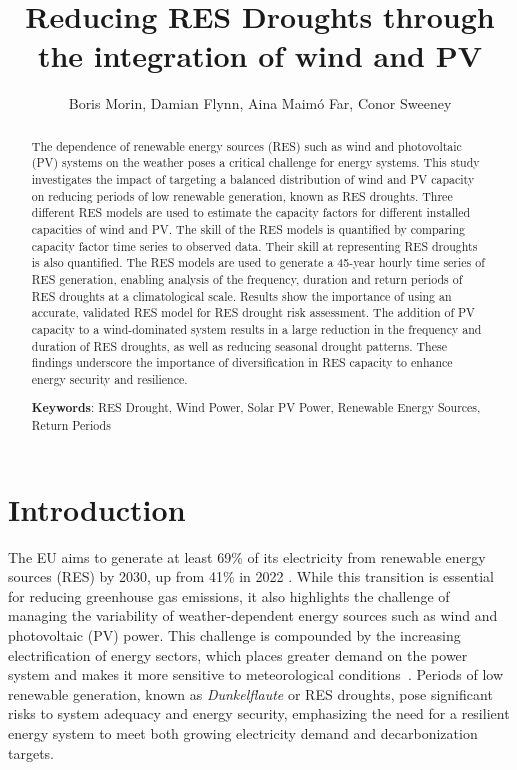 \documentclass[a4paper, 11p1t]{article}
\title{Reducing RES Droughts through the integration of wind and PV}
\author{Boris Morin, Damian Flynn, Aina Maimó Far, Conor Sweeney}
\begin{document}
\maketitle

\begin{abstract}

\noindent The dependence of renewable energy sources (RES) such as wind and photovoltaic (PV) systems on the weather poses a critical challenge for energy systems. This study investigates the impact of targeting a balanced distribution of wind and PV capacity on reducing periods of low renewable generation, known as RES droughts. Three different RES models are used to estimate the capacity factors for different installed capacities of wind and PV. The skill of the RES models is quantified by comparing capacity factor time series to observed data. Their skill at representing RES droughts is also quantified. The RES models are used to generate a 45-year hourly time series of RES generation, enabling analysis of the frequency, duration and return periods of RES droughts at a climatological scale. Results show the importance of using an accurate, validated RES model for RES drought risk assessment. The addition of PV capacity to a wind-dominated system results in a large reduction in the frequency and duration of RES droughts, as well as reducing seasonal drought patterns. These findings underscore the importance of diversification in RES capacity to enhance energy security and resilience.

\textbf{Keywords}: RES Drought, Wind Power, Solar PV Power, Renewable Energy Sources, Return Periods
\end{abstract}

\section{Introduction}
\label{sec:Intro}

The EU aims to generate at least 69\% of its electricity from renewable energy sources (RES) by 2030, up from 41\% in 2022 \cite{eurostat2023share}. While this transition is essential for reducing greenhouse gas emissions, it also highlights the challenge of managing the variability of weather-dependent energy sources such as wind and photovoltaic (PV) power. This challenge is compounded by the increasing electrification of energy sectors, which places greater demand on the power system and makes it more sensitive to meteorological conditions~\cite{bloomfield2021, bloomfield2016, vanderWiel2019drought}. Periods of low renewable generation, known as \textit{Dunkelflaute} or RES droughts, pose significant risks to system adequacy and energy security, emphasizing the need for a resilient energy system to meet both growing electricity demand and decarbonization targets.
\end{document}
